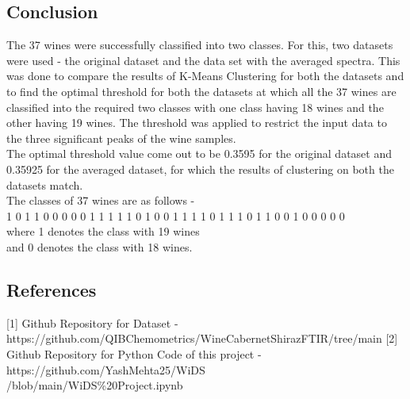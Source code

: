 \documentclass{article}
\begin{document}
\subsection{Conclusion}
The 37 wines were successfully classified into two classes. For this, two datasets were used - the original dataset and the data set with the averaged spectra. This was done to compare the results of K-Means Clustering for both the datasets and to find the optimal threshold for both the datasets at which all the 37 wines are classified into the required two classes with one class having 18 wines and the other having 19 wines. The threshold was applied to restrict the input data to the three significant peaks of the wine samples. \\
\newline
The optimal threshold value come out to be 0.3595 for the original dataset and 0.35925 for the averaged dataset, for which the results of clustering on both the datasets match.\\
\newline
The classes of 37 wines are as follows - \\
1 0 1 1 0 0 0 0 0 1 1 1 1 1 0 1 0 0 1 1 1 1 0 1 1 1 0 1 1 0 0 1 0 0 0 0 0\\
where 1 denotes the class with 19 wines \\
and 0 denotes the class with 18 wines.\\
\subsection{References}
[1] Github Repository for Dataset - https://github.com/QIBChemometrics/Wine\textunderscore Cabernet\textunderscore Shiraz\textunderscore FTIR/tree/main
[2] Github Repository for Python Code of this project - https://github.com/YashMehta25/WiDS\\
/blob/main/WiDS\%20Project.ipynb
\end{document}
